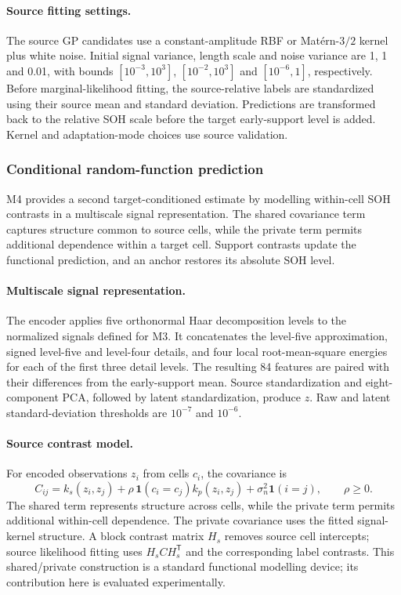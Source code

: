\documentclass[preprint,12pt]{elsarticle}
\begin{document}
\paragraph{Source fitting settings.}
The source GP candidates use a constant-amplitude RBF or Mat\'ern-$3/2$ kernel plus white noise. Initial signal variance, length scale and noise variance are 1, 1 and 0.01, with bounds $[10^{-3},10^3]$, $[10^{-2},10^3]$ and $[10^{-6},1]$, respectively. Before marginal-likelihood fitting, the source-relative labels are standardized using their source mean and standard deviation. Predictions are transformed back to the relative SOH scale before the target early-support level is added. Kernel and adaptation-mode choices use source validation.

\subsubsection{Conditional random-function prediction}
M4 provides a second target-conditioned estimate by modelling within-cell SOH contrasts in a multiscale signal representation. The shared covariance term captures structure common to source cells, while the private term permits additional dependence within a target cell. Support contrasts update the functional prediction, and an anchor restores its absolute SOH level.

\paragraph{Multiscale signal representation.}
The encoder applies five orthonormal Haar decomposition levels to the normalized signals defined for M3. It concatenates the level-five approximation, signed level-five and level-four details, and four local root-mean-square energies for each of the first three detail levels. The resulting 84 features are paired with their differences from the early-support mean. Source standardization and eight-component PCA, followed by latent standardization, produce $z$. Raw and latent standard-deviation thresholds are $10^{-7}$ and $10^{-6}$.

\paragraph{Source contrast model.}
For encoded observations $z_i$ from cells $c_i$, the covariance is
\begin{equation}
C_{ij}=k_s(z_i,z_j)+\rho\,\mathbf{1}(c_i=c_j)k_p(z_i,z_j)+\sigma_n^2\mathbf{1}(i=j),\qquad\rho\geq0.
\label{eq:m4cov}
\end{equation}
The shared term represents structure across cells, while the private term permits additional within-cell dependence. The private covariance uses the fitted signal-kernel structure. A block contrast matrix $H_s$ removes source cell intercepts; source likelihood fitting uses $H_sCH_s^{\mathsf T}$ and the corresponding label contrasts. This shared/private construction is a standard functional modelling device; its contribution here is evaluated experimentally.
\end{document}

